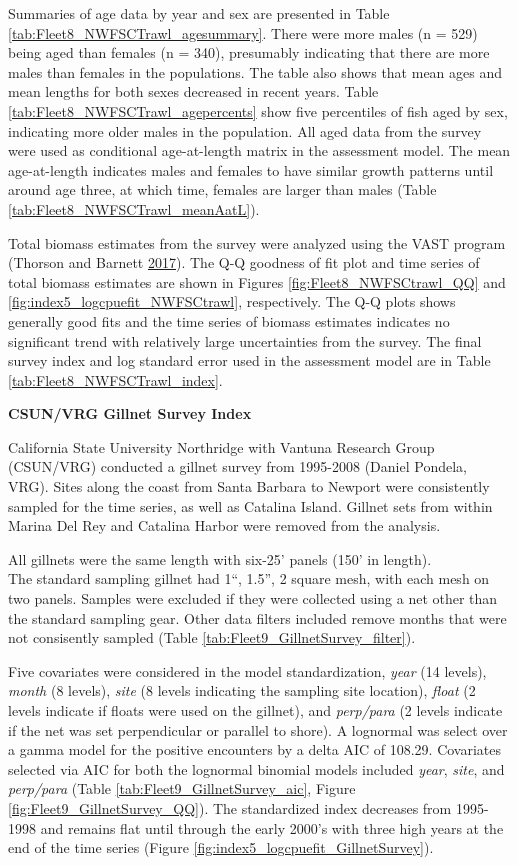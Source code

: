 \documentclass[12pt,]{article}
\begin{document}
Summaries of age data by year and sex are presented in Table
\ref{tab:Fleet8_NWFSCTrawl_agesummary}. There were more males (n = 529)
being aged than females (n = 340), presumably indicating that there are
more males than females in the populations. The table also shows that
mean ages and mean lengths for both sexes decreased in recent years.
Table \ref{tab:Fleet8_NWFSCTrawl_agepercents} show five percentiles of
fish aged by sex, indicating more older males in the population. All
aged data from the survey were used as conditional age-at-length matrix
in the assessment model. The mean age-at-length indicates males and
females to have similar growth patterns until around age three, at which
time, females are larger than males (Table
\ref{tab:Fleet8_NWFSCTrawl_meanAatL}).

Total biomass estimates from the survey were analyzed using the VAST
program (Thorson and Barnett \protect\hyperlink{ref-Thorson2017}{2017}).
The Q-Q goodness of fit plot and time series of total biomass estimates
are shown in Figures \ref{fig:Fleet8_NWFSCtrawl_QQ} and
\ref{fig:index5_logcpuefit_NWFSCtrawl}, respectively. The Q-Q plots
shows generally good fits and the time series of biomass estimates
indicates no significant trend with relatively large uncertainties from
the survey. The final survey index and log standard error used in the
assessment model are in Table \ref{tab:Fleet8_NWFSCTrawl_index}.

\textbf{CSUN/VRG Gillnet Survey Index}

California State University Northridge with Vantuna Research Group
(CSUN/VRG) conducted a gillnet survey from 1995-2008 (Daniel Pondela,
VRG). Sites along the coast from Santa Barbara to Newport were
consistently sampled for the time series, as well as Catalina Island.
Gillnet sets from within Marina Del Rey and Catalina Harbor were removed
from the analysis.

All gillnets were the same length with six-25' panels (150' in
length).\\
The standard sampling gillnet had 1``, 1.5'', 2 square mesh, with each
mesh on two panels. Samples were excluded if they were collected using a
net other than the standard sampling gear. Other data filters included
remove months that were not consisently sampled (Table
\ref{tab:Fleet9_GillnetSurvey_filter}).

Five covariates were considered in the model standardization,
\emph{year} (14 levels), \emph{month} (8 levels), \emph{site} (8 levels
indicating the sampling site location), \emph{float} (2 levels indicate
if floats were used on the gillnet), and \emph{perp/para} (2 levels
indicate if the net was set perpendicular or parallel to shore). A
lognormal was select over a gamma model for the positive encounters by a
delta AIC of 108.29. Covariates selected via AIC for both the lognormal
binomial models included \emph{year}, \emph{site}, and \emph{perp/para}
(Table \ref{tab:Fleet9_GillnetSurvey_aic}, Figure
\ref{fig:Fleet9_GillnetSurvey_QQ}). The standardized index decreases
from 1995-1998 and remains flat until through the early 2000's with
three high years at the end of the time series (Figure
\ref{fig:index5_logcpuefit_GillnetSurvey}).
\end{document}
